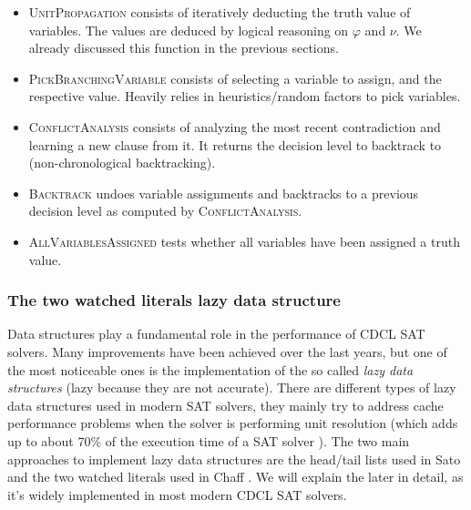 \documentclass[12pt]{diicc}
\begin{document}
\begin{itemize}
	\item \textsc{UnitPropagation} consists of iteratively deducting the truth value of variables. The values are deduced by logical reasoning on $\varphi$ and $\nu$. We already discussed this function in the previous sections.
	\item \textsc{PickBranchingVariable} consists of selecting a variable to assign, and the respective value. Heavily relies in heuristics/random factors to pick variables.
	\item \textsc{ConflictAnalysis} consists of analyzing the most recent contradiction and learning a new clause from it. It returns the decision level to backtrack to (non-chronological backtracking).
	\item \textsc{Backtrack} undoes variable assignments and backtracks to a previous decision level as computed by \textsc{ConflictAnalysis}.
	\item \textsc{AllVariablesAssigned} tests whether all variables have been assigned a truth value.
\end{itemize}


\subsubsection{The two watched literals lazy data structure}

Data structures play a fundamental role in the performance of CDCL SAT solvers. Many improvements have been achieved over the last years, but one of the most noticeable ones is the implementation of the so called \textit{lazy data structures} (lazy because they are not accurate). There are different types of lazy data structures used in modern SAT solvers, they mainly try to address cache performance problems when the solver is performing unit resolution (which adds up to about 70\% of the execution time of a SAT solver \cite{NEEDED}). The two main approaches to implement lazy data structures are the head/tail lists used in Sato \cite{sato} and the two watched literals used in Chaff \cite{chaff}. We will explain the later in detail, as it's widely implemented in most modern CDCL SAT solvers.
\end{document}
